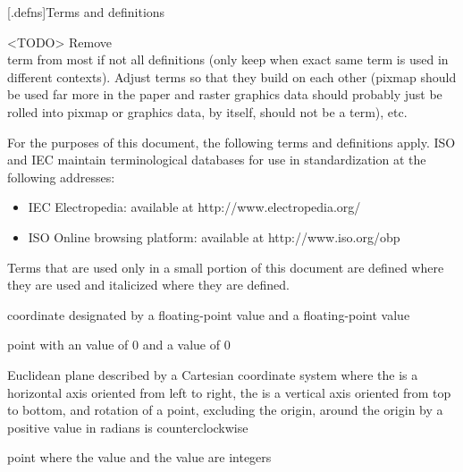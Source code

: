 
[\iotwod.defns]{Terms and definitions}

\pnum
<TODO> Remove \\term from most if not all definitions (only keep when exact same term is used in different contexts). Adjust terms so that they build on each other (pixmap should be used far more in the paper and raster graphics data should probably just be rolled into pixmap or graphics data, by itself, should not be a term), etc.

%
For the purposes of this document, the following terms and definitions apply.
ISO and IEC maintain terminological databases for use in standardization at the following addresses:
\begin{itemize}
\renewcommand{\labelitemi}{$\bullet$} %
\item IEC Electropedia: available at http://www.electropedia.org/
\item ISO Online browsing platform: available at http://www.iso.org/obp
\end{itemize}

\pnum
Terms that are used only in a small portion of this document are defined where they are used and italicized where they are defined.


%
coordinate designated by a floating-point \xaxis{} value and a floating-point \yaxis{} value

%
point with an \xaxis{} value of $0$ and a \yaxis{} value of $0$

%
Euclidean plane described by a Cartesian coordinate system where the \xaxis{} is a horizontal axis oriented from left to right, the \yaxis{} is a vertical axis oriented from top to bottom, and rotation of a point, excluding the origin, around the origin by a positive value in radians is counterclockwise

%
point where the \xaxis{} value and the \yaxis{} value are integers

